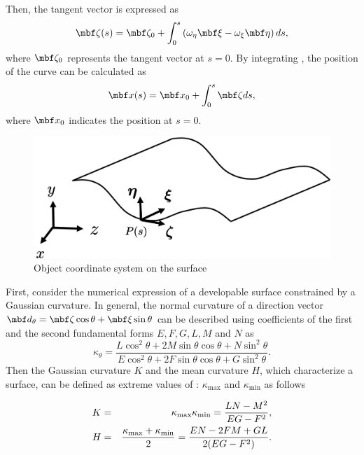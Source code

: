 \documentclass[E]{scitrans}
\begin{document}
Then, the tangent vector is expressed as 
\begin{equation}
\zetavec(s) = \zetavec_0 + \int_{0}^{s} \left( \omega_{\eta} \xivec - \omega_{\xi} \etavec \right) ds,
\label{eq:zetav_eq}
\end{equation}
where $\zetavec_0$ represents the tangent vector at $s=0$. By integrating , the position of the curve can be calculated as
\begin{equation}
\mbold{x}(s) = \mbold{x}_0 + \int_0^s \zetavec ds, 
\end{equation}
where $\mbold{x}_0$ indicates the position at $s=0$. 

\begin{figure}[thpb]
	\centering
	\includegraphics[width = 0.8\columnwidth]{./figure/Object_Coordinates.png}
	\caption{Object coordinate system on the surface}
	\label{fig:obj_coord}
\end{figure}

First, consider the numerical expression of a developable surface constrained by a Gaussian curvature. In general, the normal curvature of a direction vector $\mbold{d}_{\theta} = \zetavec \cos \theta + \xivec \sin \theta $ can be described using coefficients of the first and the second fundamental forms $E, F, G, L, M$ and $N$ as
\begin{equation}\label{eq:def_kappa_theta}
\kappa_{\theta} = \frac{L \cos^2 \theta + 2M \sin \theta \cos \theta + N \sin^2 \theta}{E \cos^2 \theta + 2F \sin \theta \cos \theta + G \sin^2 \theta}.
\end{equation}
Then the Gaussian curvature $K$ and the mean curvature $H$, which characterize a surface, can be defined as extreme values of : $ \kappa_{\max} $ and $ \kappa_{\min} $ as follows\cite{cX4}

\begin{eqnarray}
K &=& \kappa_{\max}  \kappa_{\min}  = {\displaystyle{\frac{LN-M^2}{EG-F^2}}}, \nonumber \\ 
H &=& {\displaystyle{\frac{\kappa_{\max} + \kappa_{\min}}{2}}} = \frac{EN-2FM+GL}{2(EG-F^2)}. 
\end{eqnarray}
\end{document}
